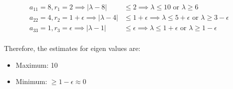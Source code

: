 \documentclass[12pt, letterpaper]{article}
\begin{document}
\begin{align*}
  a_{11} = 8 , r_1 = 2 \implies |\lambda - 8| &\leq 2
  \implies \lambda \leq 10 \text{ or } \lambda \geq 6 \\
  a_{22} = 4 , r_2 = 1 + \epsilon  \implies |\lambda - 4| &\leq 1 + \epsilon
  \implies \lambda \leq 5 + \epsilon \text{ or } \lambda \geq 3 - \epsilon \\
  a_{33} = 1 , r_3 = \epsilon  \implies |\lambda - 1| &\leq \epsilon
  \implies \lambda \leq 1 + \epsilon \text{ or } \lambda \geq 1 - \epsilon \\
\end{align*}

Therefore, the estimates for eigen values are:
\begin{itemize}
\item Maximum: 10
\item Minimum: $\geq 1 - \epsilon \approx 0$
\end{itemize}
\end{document}
